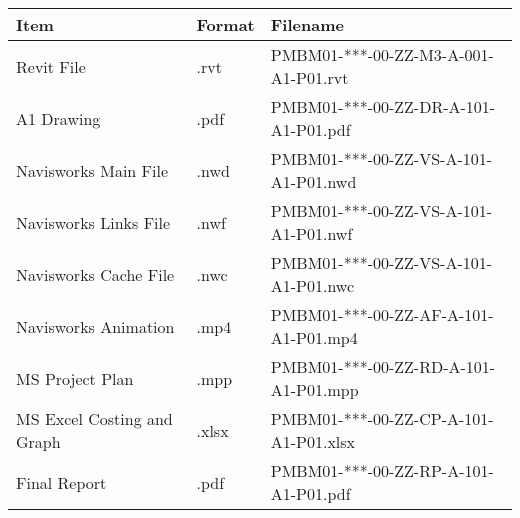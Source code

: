 \begin{tabular}{|l|l|l|}
	\hline
	\textbf{Item} & \textbf{Format} & \textbf{Filename} \\
	\hline
	Revit File  & .rvt & PMBM01-***-00-ZZ-M3-A-001-A1-P01.rvt  \\
	A1 Drawing  & .pdf & PMBM01-***-00-ZZ-DR-A-101-A1-P01.pdf  \\
	Navisworks Main File  & .nwd & PMBM01-***-00-ZZ-VS-A-101-A1-P01.nwd  \\	
	Navisworks Links File  & .nwf & PMBM01-***-00-ZZ-VS-A-101-A1-P01.nwf  \\
	Navisworks Cache File  & .nwc & PMBM01-***-00-ZZ-VS-A-101-A1-P01.nwc  \\		
	Navisworks Animation  & .mp4 & PMBM01-***-00-ZZ-AF-A-101-A1-P01.mp4  \\	
	MS Project Plan  & .mpp & PMBM01-***-00-ZZ-RD-A-101-A1-P01.mpp  \\	
	MS Excel Costing and Graph  & .xlsx & PMBM01-***-00-ZZ-CP-A-101-A1-P01.xlsx  \\
	Final Report  & .pdf & PMBM01-***-00-ZZ-RP-A-101-A1-P01.pdf  \\
	\hline
\end{tabular}




